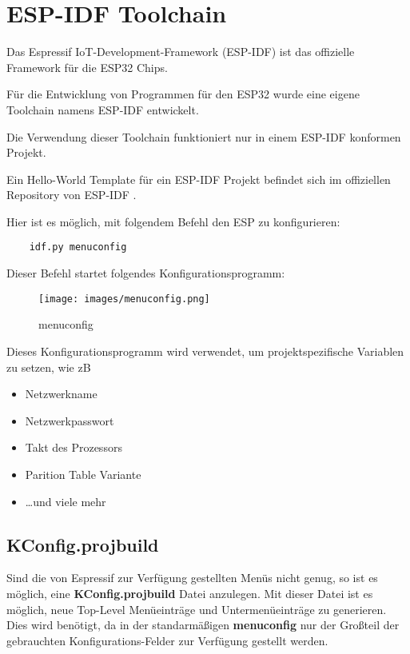 \section{ESP-IDF Toolchain}\label{sec:esp-idf-toolchain}

Das Espressif IoT-Development-Framework (ESP-IDF) ist das offizielle Framework für die ESP32 Chips. \cite{esp-idf-github}

Für die Entwicklung von Programmen für den ESP32 wurde eine eigene Toolchain namens ESP-IDF entwickelt.

Die Verwendung dieser Toolchain funktioniert nur in einem ESP-IDF konformen Projekt.

Ein Hello-World Template für ein ESP-IDF Projekt befindet sich im offiziellen Repository von ESP-IDF \cite{esp-idf-github-template}.

Hier ist es möglich, mit folgendem Befehl den ESP zu konfigurieren:

\begin{verbatim}
    idf.py menuconfig
\end{verbatim}

Dieser Befehl startet folgendes Konfigurationsprogramm:
\begin{figure}[H]
    \begin{center}
        \texttt{[image: images/menuconfig.png]}
        \caption{menuconfig \cite{menuconfig_picture}}
    \end{center}
\end{figure}
Dieses Konfigurationsprogramm wird verwendet, um projektspezifische Variablen zu setzen, wie zB
\begin{itemize}
    \item Netzwerkname
    \item Netzwerkpasswort
    \item Takt des Prozessors
    \item Parition Table Variante
    \item \dots und viele mehr
\end{itemize}


\subsection{KConfig.projbuild}\label{sec:esp-idf-projbuild}
Sind die von Espressif zur Verfügung gestellten Menüs nicht genug, so ist es möglich, eine \textbf{KConfig.projbuild} Datei anzulegen. Mit dieser Datei ist es möglich, neue Top-Level Menüeinträge und Untermenüeinträge zu generieren. Dies wird benötigt, da in der standarmäßigen \textbf{menuconfig} nur der Großteil der gebrauchten Konfigurations-Felder zur Verfügung gestellt werden. 

